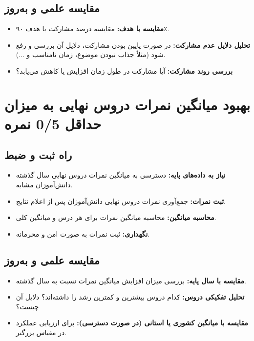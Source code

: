 \documentclass[12pt,a4paper]{article}
\begin{document}
\subsection*{مقایسه علمی و به‌روز}
\begin{itemize}
    \item \textbf{مقایسه با هدف:} مقایسه درصد مشارکت با هدف ۹۰٪.
    \item \textbf{تحلیل دلایل عدم مشارکت:} در صورت پایین بودن مشارکت، دلایل آن بررسی و رفع شود (مثلاً جذاب نبودن موضوع، زمان نامناسب و ...).
    \item \textbf{بررسی روند مشارکت:} آیا مشارکت در طول زمان افزایش یا کاهش می‌یابد؟
\end{itemize}

\section{بهبود میانگین نمرات دروس نهایی به میزان حداقل 0/5 نمره}

\subsection*{راه ثبت و ضبط}
\begin{itemize}
    \item \textbf{نیاز به داده‌های پایه:} دسترسی به میانگین نمرات دروس نهایی سال گذشته دانش‌آموزان مشابه.
    \item \textbf{ثبت نمرات:} جمع‌آوری نمرات دروس نهایی دانش‌آموزان پس از اعلام نتایج.
    \item \textbf{محاسبه میانگین:} محاسبه میانگین نمرات برای هر درس و میانگین کلی.
    \item \textbf{نگهداری:} ثبت نمرات به صورت امن و محرمانه.
\end{itemize}

\subsection*{مقایسه علمی و به‌روز}
\begin{itemize}
    \item \textbf{مقایسه با سال پایه:} بررسی میزان افزایش میانگین نمرات نسبت به سال گذشته.
    \item \textbf{تحلیل تفکیکی دروس:} کدام دروس بیشترین و کمترین رشد را داشته‌اند؟ دلایل آن چیست؟
    \item \textbf{مقایسه با میانگین کشوری یا استانی (در صورت دسترسی):} برای ارزیابی عملکرد در مقیاس بزرگتر.
\end{itemize}
\end{document}
